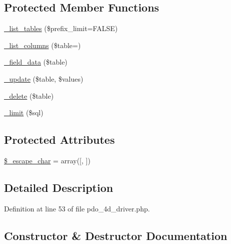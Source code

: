 \subsection*{Protected Member Functions}
\begin{DoxyCompactItemize}
\item 
\mbox{\hyperlink{class_c_i___d_b__pdo__4d__driver_a435c0f3ce54fe7daa178baa8532ebd54}{\+\_\+list\+\_\+tables}} (\$prefix\+\_\+limit=F\+A\+L\+SE)
\item 
\mbox{\hyperlink{class_c_i___d_b__pdo__4d__driver_a7ccb7f9c301fe7f0a9db701254142b63}{\+\_\+list\+\_\+columns}} (\$table=\textquotesingle{}\textquotesingle{})
\item 
\mbox{\hyperlink{class_c_i___d_b__pdo__4d__driver_a95247d9671893adc3444cb184ad32ea1}{\+\_\+field\+\_\+data}} (\$table)
\item 
\mbox{\hyperlink{class_c_i___d_b__pdo__4d__driver_a2540b03a93fa73ae74c10d0e16fc073e}{\+\_\+update}} (\$table, \$values)
\item 
\mbox{\hyperlink{class_c_i___d_b__pdo__4d__driver_a133ea8446ded52589bd22cc9163d0896}{\+\_\+delete}} (\$table)
\item 
\mbox{\hyperlink{class_c_i___d_b__pdo__4d__driver_a3a02ea06541b8ecc25a33a61651562c8}{\+\_\+limit}} (\$sql)
\end{DoxyCompactItemize}
\subsection*{Protected Attributes}
\begin{DoxyCompactItemize}
\item 
\mbox{\hyperlink{class_c_i___d_b__pdo__4d__driver_aaec2fb0112850159063a8e47ad3aed6e}{\$\+\_\+escape\+\_\+char}} = array(\textquotesingle{}\mbox{[}\textquotesingle{}, \textquotesingle{}\mbox{]}\textquotesingle{})
\end{DoxyCompactItemize}


\subsection{Detailed Description}


Definition at line 53 of file pdo\+\_\+4d\+\_\+driver.\+php.



\subsection{Constructor \& Destructor Documentation}
\mbox{\label{class_c_i___d_b__pdo__4d__driver_a9162320adff1a1a4afd7f2372f753a3e}} 
